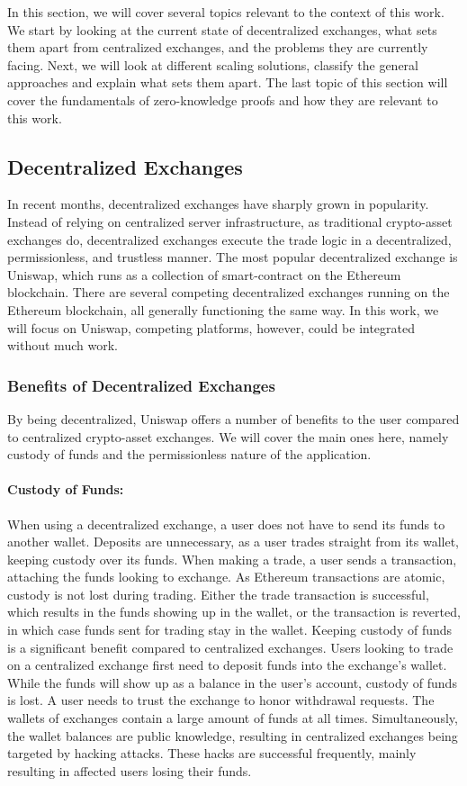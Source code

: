 \documentclass[../../thesis.tex]{subfiles}
\begin{document}
In this section, we will cover several topics relevant to the context of this work. We start by looking at the current state of decentralized exchanges, what sets them apart from centralized exchanges, and the problems they are currently facing. Next, we will look at different scaling solutions, classify the general approaches and explain what sets them apart. The last topic of this section will cover the fundamentals of zero-knowledge proofs and how they are relevant to this work.

\subsection{Decentralized Exchanges}
In recent months, decentralized exchanges have sharply grown in popularity. Instead of relying on centralized server infrastructure, as traditional crypto-asset exchanges do, decentralized exchanges execute the trade logic in a decentralized, permissionless, and trustless manner. The most popular decentralized exchange is Uniswap, which runs as a collection of smart-contract on the Ethereum blockchain. There are several competing decentralized exchanges running on the Ethereum blockchain, all generally functioning the same way. In this work, we will focus on Uniswap, competing platforms, however, could be integrated without much work. 

\subsubsection{Benefits of Decentralized Exchanges}
By being decentralized, Uniswap offers a number of benefits to the user compared to centralized crypto-asset exchanges. We will cover the main ones here, namely custody of funds and the permissionless nature of the application.

\paragraph{Custody of Funds:}
When using a decentralized exchange, a user does not have to send its funds to another wallet. Deposits are unnecessary, as a user trades straight from its wallet, keeping custody over its funds. When making a trade, a user sends a transaction, attaching the funds looking to exchange. As Ethereum transactions are atomic, custody is not lost during trading. Either the trade transaction is successful, which results in the funds showing up in the wallet, or the transaction is reverted, in which case funds sent for trading stay in the wallet. Keeping custody of funds is a significant benefit compared to centralized exchanges. Users looking to trade on a centralized exchange first need to deposit funds into the exchange's wallet. While the funds will show up as a balance in the user's account, custody of funds is lost. A user needs to trust the exchange to honor withdrawal requests.  The wallets of exchanges contain a large amount of funds at all times. Simultaneously, the wallet balances are public knowledge, resulting in centralized exchanges being targeted by hacking attacks. These hacks are successful frequently, mainly resulting in affected users losing their funds. 
\end{document}
